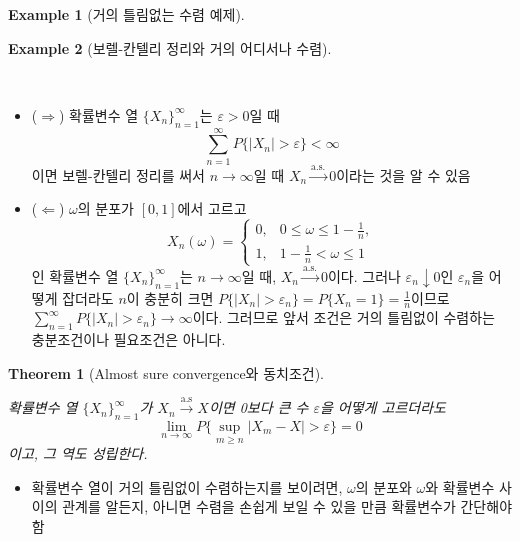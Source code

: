 \documentclass[
  letterpaper,
  DIV=11,
  numbers=noendperiod]{scrreprt}
\providecommand{\tightlist}{%
  \setlength{\itemsep}{0pt}\setlength{\parskip}{0pt}}\usepackage{longtable,booktabs,array}
\theoremstyle{plain}
\newtheorem{theorem}{Theorem}[chapter]
\theoremstyle{definition}
\newtheorem{example}{Example}[chapter]
\theoremstyle{definition}
\theoremstyle{plain}
\theoremstyle{plain}
\theoremstyle{remark}
\begin{document}
\begin{example}[거의 틀림없는 수렴
예제]
\end{example}

\begin{example}[보렐-칸텔리 정리와 거의 어디서나
수렴]\protect\hypertarget{exm-asconv02}{}\label{exm-asconv02}

~

\begin{itemize}
\item
  (\(\Longrightarrow\)) 확률변수 열 \(\{X_n\}_{n=1}^{\infty}\)는
  \(\varepsilon>0\)일 때 \[
  \sum_{n=1}^\infty P\{ |X_n | > \varepsilon\} < \infty
  \] 이면 보렐-칸텔리 정리를 써서 \(n\rightarrow \infty\)일 때
  \(X_n \stackrel{\text{a.s.}}{\rightarrow} 0\)이라는 것을 알 수 있음
\item
  (\(\Longleftarrow\)) \(\omega\)의 분포가 \([0,1]\)에서 고르고 \[
  X_n (\omega)=
  \begin{cases}
  0, & 0 \leq \omega \leq 1-\frac{1}{n},\\
  1, & 1- \frac{1}{n}< \omega \leq 1
  \end{cases}
  \] 인 확률변수 열 \(\{X_n\}_{n=1}^{\infty}\)는
  \(n\rightarrow \infty\)일 때,
  \(X_n \stackrel{\text{a.s.}}{\rightarrow}0\)이다. 그러나
  \(\varepsilon_n \downarrow 0\)인 \(\varepsilon_n\)을 어떻게 잡더라도
  \(n\)이 충분히 크면
  \(P\{ |X_n| > \varepsilon_n \} = P\{ X_n = 1\}= \frac{1}{n}\)이므로
  \(\sum_{n=1}^{\infty}P\{ |X_n| > \varepsilon_n\}\rightarrow \infty\)이다.
  그러므로 앞서 조건은 거의 틀림없이 수렴하는 충분조건이나 필요조건은
  아니다.
\end{itemize}

\end{example}

\begin{theorem}[Almost sure convergence와
동치조건]\protect\hypertarget{thm-asconv}{}\label{thm-asconv}

확률변수 열 \(\{X_n\}_{n=1}^{\infty}\)가
\(X_n \stackrel{\text{a.s}}{\rightarrow}X\)이면 0보다 큰 수
\(\varepsilon\)을 어떻게 고르더라도 \[
\lim_{n\rightarrow\infty} P \{ \sup_{m\geq n} |X_m - X| > \varepsilon \} = 0
\] 이고, 그 역도 성립한다.

\end{theorem}

\begin{tcolorbox}[enhanced jigsaw, opacityback=0, colframe=quarto-callout-note-color-frame, breakable, left=2mm, arc=.35mm, rightrule=.15mm, titlerule=0mm, coltitle=black, title=\textcolor{quarto-callout-note-color}{\faInfo}\hspace{0.5em}{Remark}, colbacktitle=quarto-callout-note-color!10!white, toptitle=1mm, bottomtitle=1mm, leftrule=.75mm, toprule=.15mm, colback=white, opacitybacktitle=0.6, bottomrule=.15mm]

\begin{itemize}
\tightlist
\item
  확률변수 열이 거의 틀림없이 수렴하는지를 보이려면, \(\omega\)의 분포와
  \(\omega\)와 확률변수 사이의 관계를 알든지, 아니면 수렴을 손쉽게 보일
  수 있을 만큼 확률변수가 간단해야 함
\end{itemize}

\end{tcolorbox}
\end{document}
